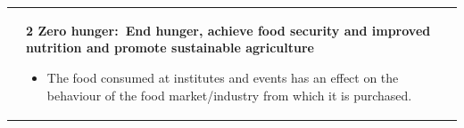 \documentclass[../SustainableHEP.tex]{subfiles}
\begin{document}
\begin{longtable*}{l l}
\parbox[t]{\SDGleft\textwidth}{} & \parbox[t]{\SDGright\textwidth}{\textbf{2 Zero hunger:\ End hunger, achieve food security and improved nutrition and promote sustainable agriculture}
\begin{itemize}[leftmargin=20pt]
\item The food consumed at institutes and events has an effect on the behaviour of the food market/industry from which it is purchased.
\end{itemize}}\\


\end{longtable*}
\end{document}
